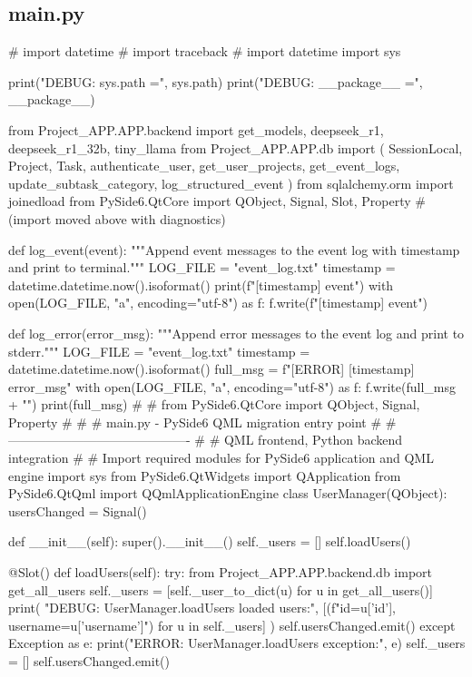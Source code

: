 \documentclass{report}
\begin{document}
\subsection{main.py}
\begin{python}
# import datetime
# import traceback
# 
import datetime
import sys

print("DEBUG: sys.path =", sys.path)
print("DEBUG: __package__ =", __package__)

from Project_APP.APP.backend import get_models, deepseek_r1, deepseek_r1_32b, tiny_llama
from Project_APP.APP.db import (
    SessionLocal,
    Project,
    Task,
    authenticate_user,
    get_user_projects,
    get_event_logs,
    update_subtask_category,
    log_structured_event
)
from sqlalchemy.orm import joinedload
from PySide6.QtCore import QObject, Signal, Slot, Property
# (import moved above with diagnostics)

def log_event(event):
    """Append event messages to the event log with timestamp and print to terminal."""
    LOG_FILE = "event_log.txt"
    timestamp = datetime.datetime.now().isoformat()
    print(f"[{timestamp}] {event}")
    with open(LOG_FILE, "a", encoding="utf-8") as f:
        f.write(f"[{timestamp}] {event}\n")

def log_error(error_msg):
    """Append error messages to the event log and print to stderr."""
    LOG_FILE = "event_log.txt"
    timestamp = datetime.datetime.now().isoformat()
    full_msg = f"[ERROR] [{timestamp}] {error_msg}"
    with open(LOG_FILE, "a", encoding="utf-8") as f:
        f.write(full_msg + "\n")
    print(full_msg)
# 
# from PySide6.QtCore import QObject, Signal, Property
# 
# # main.py - PySide6 QML migration entry point
# # -------------------------------------------
# # QML frontend, Python backend integration
# 
# Import required modules for PySide6 application and QML engine
import sys
from PySide6.QtWidgets import QApplication
from PySide6.QtQml import QQmlApplicationEngine
class UserManager(QObject):
    usersChanged = Signal()

    def __init__(self):
        super().__init__()
        self._users = []
        self.loadUsers()

    @Slot()
    def loadUsers(self):
        try:
            from Project_APP.APP.backend.db import get_all_users
            self._users = [self._user_to_dict(u) for u in get_all_users()]
            print(
                "DEBUG: UserManager.loadUsers loaded users:",
                [(f"id={u['id']}, username={u['username']}") for u in self._users]
            )
            self.usersChanged.emit()
        except Exception as e:
            print("ERROR: UserManager.loadUsers exception:", e)
            self._users = []
            self.usersChanged.emit()


\end{python}
\end{document}
